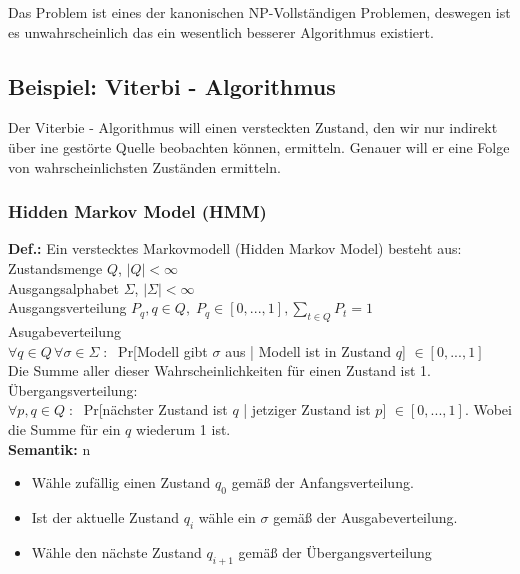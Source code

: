 Das Problem ist eines der kanonischen NP-Vollständigen Problemen, deswegen ist es unwahrscheinlich das ein wesentlich besserer Algorithmus existiert.

\subsection{Beispiel: Viterbi - Algorithmus}

Der Viterbie - Algorithmus will einen versteckten Zustand, den wir nur indirekt über ine gestörte Quelle beobachten können, ermitteln. Genauer will er eine Folge von wahrscheinlichsten Zuständen ermitteln.

\subsubsection{Hidden Markov Model (HMM)}

\textbf{Def.:} Ein verstecktes Markovmodell (Hidden Markov Model) besteht aus:\\

Zustandsmenge $Q$, $|Q| < \infty$\\
Ausgangsalphabet $\Sigma$, $| \Sigma | < \infty$\\
Ausgangsverteilung $P_q, q \in Q, \; P_q \in [0,...,1], \underset{t\in Q}{\sum} P_t = 1$\\
Asugabeverteilung \\
$\forall q \in Q \, \forall \sigma \in \Sigma \; : \;$ Pr[Modell gibt $\sigma$ aus | Modell ist in Zustand $q$] $\in [0,...,1]$\\
Die Summe aller dieser Wahrscheinlichkeiten für einen Zustand ist 1.\\
Übergangsverteilung:\\
$\forall p,q \in Q \; : \; $ Pr[nächster Zustand ist $q$ | jetziger Zustand ist $p$] $\in [0,..., 1]$. Wobei die Summe für ein $q$ wiederum 1 ist.\\

\textbf{Semantik:} n
\begin{itemize}

\item Wähle zufällig einen Zustand $q_0$ gemäß der Anfangsverteilung.

\item Ist der aktuelle Zustand $q_i$ wähle ein $\sigma$ gemäß der Ausgabeverteilung.

\item Wähle den nächste Zustand $q_{i+1}$ gemäß der Übergangsverteilung

\end{itemize}

